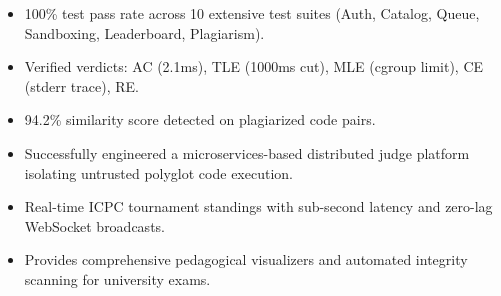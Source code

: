 \documentclass[10pt]{article}
\begin{document}
\begin{minipage}[t]{0.492\textwidth}
\end{minipage}

\vspace{1.8mm}

\begin{minipage}[t]{0.324\textwidth}
  \begin{tcolorbox}[
    equal height group=bottomgroup,
    colback=testbg, colframe=testframe,
    title={\textbf{\color{testtitle}Results \& Testing}},
    fonttitle=\fontsize{8.5}{10}\selectfont,
    coltitle=testtitle, colbacktitle=testbg,
    boxrule=0.7pt, arc=1.5mm,
    top=3pt, bottom=3pt, left=4pt, right=4pt, toptitle=1pt, bottomtitle=1pt
  ]
  \fontsize{7.0}{8.3}\selectfont
  \begin{itemize}
    \item 100\% test pass rate across 10 extensive test suites (Auth, Catalog, Queue, Sandboxing, Leaderboard, Plagiarism).
    \item Verified verdicts: AC (2.1ms), TLE (1000ms cut), MLE (cgroup limit), CE (stderr trace), RE.
    \item 94.2\% similarity score detected on plagiarized code pairs.
  \end{itemize}
  \end{tcolorbox}
\end{minipage}\hfill
\begin{minipage}[t]{0.324\textwidth}
  \begin{tcolorbox}[
    equal height group=bottomgroup,
    colback=concbg, colframe=concframe,
    title={\textbf{\color{conctitle}Conclusion}},
    fonttitle=\fontsize{8.5}{10}\selectfont,
    coltitle=conctitle, colbacktitle=concbg,
    boxrule=0.7pt, arc=1.5mm,
    top=3pt, bottom=3pt, left=4pt, right=4pt, toptitle=1pt, bottomtitle=1pt
  ]
  \fontsize{7.0}{8.3}\selectfont
  \begin{itemize}
    \item Successfully engineered a microservices-based distributed judge platform isolating untrusted polyglot code execution.
    \item Real-time ICPC tournament standings with sub-second latency and zero-lag WebSocket broadcasts.
    \item Provides comprehensive pedagogical visualizers and automated integrity scanning for university exams.
  \end{itemize}
  \end{tcolorbox}
\end{minipage}\hfill
\end{document}

